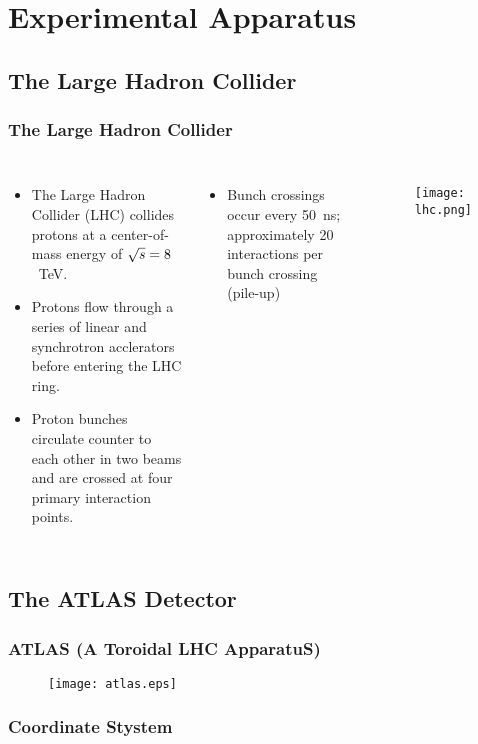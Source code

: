 \section{Experimental Apparatus}

\subsection{The Large Hadron Collider}

\begin{frame}
\frametitle{The Large Hadron Collider}
\begin{columns}
\begin{itemize}
    \item The Large Hadron Collider (LHC) collides protons at a
        center-of-mass energy of $\sqrt{s} = 8$~TeV.
    \item Protons flow through a series of linear and synchrotron
        acclerators before entering the LHC ring.
    \item Proton bunches circulate counter to each other in two
        beams and are crossed at four primary interaction points.
\end{itemize}
\begin{itemize}
    \item Bunch crossings occur every 50~ns; approximately 20
        interactions per bunch crossing (pile-up)
\end{itemize}
\vfill
\begin{figure}
\centering
\texttt{[image: lhc.png]}
\end{figure}
\end{columns}
\end{frame}

\subsection{The ATLAS Detector}

\begin{frame}
    \frametitle{ATLAS (A Toroidal LHC ApparatuS)}
\begin{figure}
\centering
\texttt{[image: atlas.eps]}
\end{figure}
\end{frame}

\subsubsection{Coordinate Stystem}

